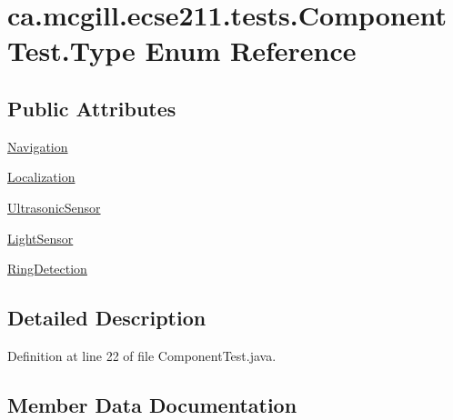\hypertarget{enumca_1_1mcgill_1_1ecse211_1_1tests_1_1_component_test_1_1_type}{}\section{ca.\+mcgill.\+ecse211.\+tests.\+Component\+Test.\+Type Enum Reference}
\label{enumca_1_1mcgill_1_1ecse211_1_1tests_1_1_component_test_1_1_type}
\subsection*{Public Attributes}
\begin{DoxyCompactItemize}
\item 
\hyperlink{enumca_1_1mcgill_1_1ecse211_1_1tests_1_1_component_test_1_1_type_a70ec62ab2b745dd99e291459279910ea}{Navigation}
\item 
\hyperlink{enumca_1_1mcgill_1_1ecse211_1_1tests_1_1_component_test_1_1_type_acdc93de9366f2e6710c7f2fc0e4478c3}{Localization}
\item 
\hyperlink{enumca_1_1mcgill_1_1ecse211_1_1tests_1_1_component_test_1_1_type_acb88d74b8bd35b190f8b1b05730c213a}{Ultrasonic\+Sensor}
\item 
\hyperlink{enumca_1_1mcgill_1_1ecse211_1_1tests_1_1_component_test_1_1_type_aa8c9262ad5014cd52ecce2eec6604510}{Light\+Sensor}
\item 
\hyperlink{enumca_1_1mcgill_1_1ecse211_1_1tests_1_1_component_test_1_1_type_ab118eac94e0b37e6871a4c9a788c675e}{Ring\+Detection}
\end{DoxyCompactItemize}


\subsection{Detailed Description}


Definition at line 22 of file Component\+Test.\+java.



\subsection{Member Data Documentation}
\mbox{\label{enumca_1_1mcgill_1_1ecse211_1_1tests_1_1_component_test_1_1_type_aa8c9262ad5014cd52ecce2eec6604510}} 

